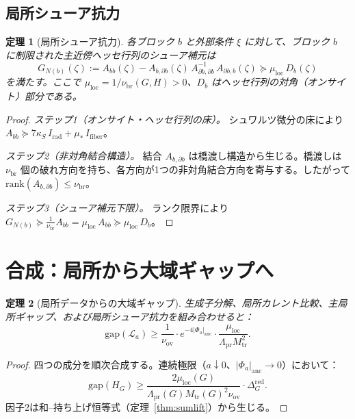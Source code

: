 \documentclass[12pt]{article}
\theoremstyle{plain}
\newtheorem{theorem}{定理}[section]
\theoremstyle{definition}
\numberwithin{equation}{section}
\newcommand{\pr}{\mathrm{pr}}
\newcommand{\loc}{\mathrm{loc}}
\newcommand{\red}{\mathrm{red}}
\newcommand{\br}{\mathrm{br}}
\newcommand{\ov}{\mathrm{ov}}
\newcommand{\tr}{\mathrm{tr}}
\begin{document}
\subsection{局所シューア抗力}

\begin{theorem}[局所シューア抗力]\label{thm:localSchur}
各ブロック $b$ と外部条件 $\xi$ に対して、ブロック $b$ に制限された主近傍ヘッセ行列のシューア補元は
\begin{equation}
G_{N(b)}(\zeta) := A_{bb}(\zeta) - A_{b,\partial b}(\zeta)\,A_{\partial b,\partial b}^{-1}\,A_{\partial b,b}(\zeta) \succeq \mu_{\loc}\,D_b(\zeta)
\end{equation}
を満たす。ここで $\mu_{\loc}=1/\nu_{\br}(G,H)>0$、$D_b$ はヘッセ行列の対角（オンサイト）部分である。
\end{theorem}

\begin{proof}
\emph{ステップ1（オンサイト・ヘッセ行列の床）。} シュワルツ微分の床により $A_{bb}\succeq 7\kappa_S\,I_{\mathrm{rad}}+\mu_*\,I_{\mathrm{fiber}}$。

\emph{ステップ2（非対角結合構造）。} 結合 $A_{b,\partial b}$ は橋渡し構造から生じる。橋渡しは $\nu_{\br}$ 個の破れ方向を持ち、各方向が1つの非対角結合方向を寄与する。したがって $\mathrm{rank}(A_{b,\partial b})\leq\nu_{\br}$。

\emph{ステップ3（シューア補元下限）。} ランク限界により $G_{N(b)}\succeq\frac{1}{\nu_{\br}}A_{bb}=\mu_{\loc}\,A_{bb}\succeq\mu_{\loc}\,D_b$。
\end{proof}


\section{合成：局所から大域ギャップへ}\label{sec:assembly}

\begin{theorem}[局所データからの大域ギャップ]\label{thm:globalgap}
生成子分解、局所カレント比較、主局所ギャップ、および局所シューア抗力を組み合わせると：
\begin{equation}
\mathrm{gap}(\mathcal{L}_a) \geq \frac{1}{\nu_{\ov}}\cdot e^{-4|\Phi_a|_{\mathrm{anc}}}\cdot\frac{\mu_{\loc}}{\Lambda_{\pr}M_{\tr}^2}.
\end{equation}
\end{theorem}

\begin{proof}
四つの成分を順次合成する。連続極限（$a\downarrow 0$、$|\Phi_a|_{\mathrm{anc}}\to 0$）において：
\begin{equation}
\mathrm{gap}(H_G) \geq \frac{2\mu_{\loc}(G)}{\Lambda_{\pr}(G)M_{\tr}(G)^2\nu_{\ov}}\cdot\Delta_G^{\red}.
\end{equation}
因子2は和--持ち上げ恒等式（定理~\ref{thm:sumlift}）から生じる。
\end{proof}
\end{document}
